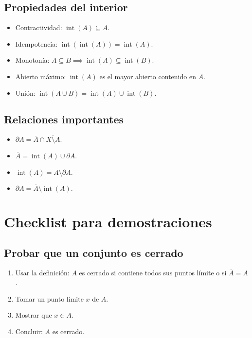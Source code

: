 \documentclass[12pt]{article}
\begin{document}
\subsection*{Propiedades del interior}
\begin{itemize}
    \item Contractividad: $\operatorname{int}(A) \subseteq A$.
    \item Idempotencia: $\operatorname{int}(\operatorname{int}(A)) = \operatorname{int}(A)$.
    \item Monotonía: $A \subseteq B \implies \operatorname{int}(A) \subseteq \operatorname{int}(B)$.
    \item Abierto máximo: $\operatorname{int}(A)$ es el mayor abierto contenido en $A$.
    \item Unión: $\operatorname{int}(A \cup B) = \operatorname{int}(A) \cup \operatorname{int}(B)$.
\end{itemize}

\subsection*{Relaciones importantes}
\begin{itemize}
    \item $\partial A = \overline{A} \cap \overline{X \setminus A}$.
    \item $\overline{A} = \operatorname{int}(A) \cup \partial A$.
    \item $\operatorname{int}(A) = A \setminus \partial A$.
    \item $\partial A = \overline{A} \setminus \operatorname{int}(A)$.
\end{itemize}

\section*{Checklist para demostraciones}

\subsection*{Probar que un conjunto es cerrado}
\begin{enumerate}
    \item Usar la definición: $A$ es cerrado si contiene todos sus puntos límite o si $\overline{A} = A$.
    \item Tomar un punto límite $x$ de $A$.
    \item Mostrar que $x \in A$.
    \item Concluir: $A$ es cerrado.
\end{enumerate}
\end{document}
